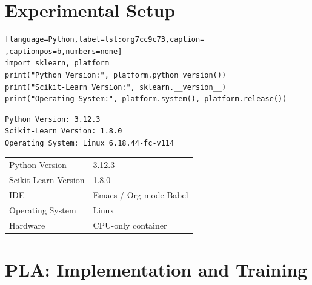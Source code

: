 \documentclass[11pt]{article}
\begin{document}
\section{Experimental Setup}
\label{sec:org96d37ef}

\begin{lstlisting}[language=Python,label=lst:org7cc9c73,caption= ,captionpos=b,numbers=none]
import sklearn, platform
print("Python Version:", platform.python_version())
print("Scikit-Learn Version:", sklearn.__version__)
print("Operating System:", platform.system(), platform.release())
\end{lstlisting}

\begin{verbatim}
Python Version: 3.12.3
Scikit-Learn Version: 1.8.0
Operating System: Linux 6.18.44-fc-v114
\end{verbatim}


\begin{center}
\begin{tabular}{ll}
\hline
Python Version & 3.12.3\\[0pt]
Scikit-Learn Version & 1.8.0\\[0pt]
IDE & Emacs / Org-mode Babel\\[0pt]
Operating System & Linux\\[0pt]
Hardware & CPU-only container\\[0pt]
\hline
\end{tabular}
\end{center}

\section{PLA: Implementation and Training}
\label{sec:org7fed624}
\end{document}
